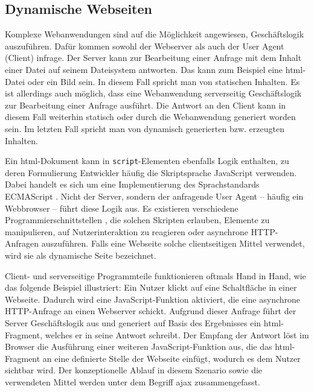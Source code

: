         \subsection{Dynamische Webseiten}
            Komplexe Webanwendungen sind auf die Möglichkeit angewiesen, Geschäftslogik auszuführen.
            Dafür kommen sowohl der Webserver als auch der User Agent (Client) infrage.
            Der Server kann zur Bearbeitung einer Anfrage mit dem Inhalt einer Datei auf seinem Dateisystem antworten.
            Das kann zum Beispiel eine \gls{html}-Datei oder ein Bild sein.
            In diesem Fall spricht man von statischen Inhalten.
            Es ist allerdings auch möglich,
            dass eine Webanwendung serverseitig Geschäftslogik zur Bearbeitung einer Anfrage ausführt.
            Die Antwort an den Client kann in diesem Fall weiterhin statisch oder
            durch die Webanwendung generiert worden sein.
            Im letzten Fall spricht man von dynamisch generierten bzw. erzeugten Inhalten.

            Ein \gls{html}-Dokument kann in \texttt{script}-Elementen \cite[Kapitel 4.11.1]{w3c:html5} ebenfalls Logik enthalten,
            zu deren Formulierung Entwickler häufig die Skriptsprache JavaScript verwenden.
            Dabei handelt es sich um eine Implementierung des Sprachstandards ECMAScript
            \cite{ecma:ecmaScript}.
            Nicht der Server, sondern der anfragende User Agent -- häufig ein Webbrowser -- führt diese Logik aus.
            Es existieren verschiedene Programmierschnittstellen \cite[Kapitel 8]{whatwg:html},
            die solchen Skripten erlauben,
            Elemente zu manipulieren, auf Nutzerinteraktion zu reagieren
            oder asynchrone HTTP-Anfragen \cite{whatwg:xhr} auszuführen.
            Falls eine Webseite solche clientseitigen Mittel verwendet,
            wird sie als dynamische Seite bezeichnet.
            
            Client- und serverseitige Programmteile funktionieren oftmals Hand in Hand,
            wie das folgende Beispiel illustriert:
            Ein Nutzer klickt auf eine Schaltfläche in einer Webseite.
            Dadurch wird eine JavaScript-Funktion aktiviert,
            die eine asynchrone HTTP-Anfrage an einen Webserver schickt.
            Aufgrund dieser Anfrage führt der Server Geschäftslogik aus
            und generiert auf Basis des Ergebnisses ein \gls{html}-Fragment,
            welches er in seine Antwort schreibt.
            Der Empfang der Antwort löst im Browser die Ausführung einer weiteren
            JavaScript-Funktion aus, die das \gls{html}-Fragment
            an eine definierte Stelle der Webseite einfügt,
            wodurch es dem Nutzer sichtbar wird.
            Der konzeptionelle Ablauf in diesem Szenario sowie die verwendeten Mittel
            werden unter dem Begriff \gls{ajax} \cite{garrett:ajax} zusammengefasst.

